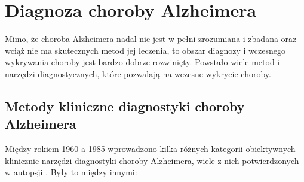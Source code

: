 \section{Diagnoza choroby Alzheimera}

Mimo, że choroba Alzheimera nadal nie jest w pełni zrozumiana i zbadana oraz wciąż nie ma skutecznych metod jej leczenia, to obszar diagnozy i wczesnego wykrywania choroby jest bardzo dobrze rozwinięty.
Powstało wiele metod i narzędzi diagnostycznych, które pozwalają na wczesne wykrycie choroby.

\subsection{Metody kliniczne diagnostyki choroby Alzheimera}

Między rokiem 1960 a 1985 wprowadzono kilka różnych kategorii obiektywnych klinicznie narzędzi diagnostyki choroby Alzheimera, wiele z nich potwierdzonych w autopsji \cite{khachaturian2006diagnosis}.
Były to między innymi:

